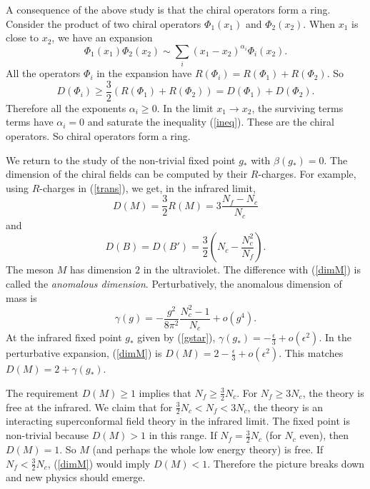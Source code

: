 \documentclass[lecture]{qft-l}
\newcommand{\al}{\alpha}
\newcommand{\eps}{\epsilon}
\newcommand{\gam}{\gamma}
\newcommand{\PHI}{\varPhi}
\newcommand{\BT}{B'}%
\numberwithin{figure}{chapter}
\begin{document}
A consequence of the above study is that the chiral operators form a ring.
Consider the product of two chiral operators $\PHI_1(x_1)$ and $\PHI_2(x_2)$.
When $x_1$ is close to $x_2$, we have an expansion
	\begin{equation}
\PHI_1(x_1)\PHI_2(x_2)\sim\sum_i(x_1-x_2)^{\al_i}\PHI_i(x_2).
	\end{equation}
All the operators $\PHI_i$ in the expansion have 
$R(\PHI_i)=R(\PHI_1)+R(\PHI_2)$.
So 
	\begin{equation}\label{ineq}
D(\PHI_i)\ge{\textstyle \frac{3}{2}}(R(\PHI_1)+R(\PHI_2))=D(\PHI_1)+D(\PHI_2).
	\end{equation}
Therefore all the exponents $\al_i\ge0$.
In the limit $x_1\to x_2$, the surviving terms terms have $\al_i=0$
and saturate the inequality (\ref{ineq}).
These are the chiral operators.
So chiral operators form a ring.

We return to the study of the non-trivial fixed point $g_*$ with 
$\beta(g_*)=0$.
The dimension of the chiral fields can be computed by their $R$-charges.
For example, using $R$-charges in (\ref{trans}), we get, in the infrared limit,
	\begin{equation}\label{dimM}
D(M)=\frac{3}{2}R(M)=3\frac{N_f-N_c}{N_c}
	\end{equation}
and
	\begin{equation}
D(B)=D(\BT)=\frac{3}{2}\left(N_c-\frac{N_c^2}{N_f}\right).
	\end{equation}
The meson $M$ has dimension $2$ in the ultraviolet.
The difference with (\ref{dimM}) is called the {\em anomalous dimension}.
Perturbatively, the anomalous dimension of mass is
	\begin{equation}
\gam(g)=-\frac{g^2}{8\pi^2}\frac{N_c^2-1}{N_c}+o(g^4).
	\end{equation}
At the infrared fixed point $g_*$ given by (\ref{gstar}),
$\gam(g_*)=-\frac{\eps}{3}+o(\eps^2)$.
In the perturbative expansion, (\ref{dimM}) is 
$D(M)=2-\frac{\eps}{3}+o(\eps^2)$.
This matches $D(M)=2+\gam(g_*)$.

The requirement $D(M)\ge1$ implies that $N_f\ge\frac{3}{2}N_c$.
For $N_f\ge3N_c$, the theory is free at the infrared.
We claim that for $\frac{3}{2}N_c<N_f<3N_c$, the theory is an interacting
superconformal field theory in the infrared limit.
The fixed point is non-trivial because $D(M)>1$ in this range.
If $N_f=\frac{3}{2}N_c$ (for $N_c$ even), then $D(M)=1$.
So $M$ (and perhaps the whole low energy theory) is free.
If $N_f<\frac{3}{2}N_c$, (\ref{dimM}) would imply $D(M)<1$.
Therefore the picture breaks down and new physics should emerge.
\end{document}
